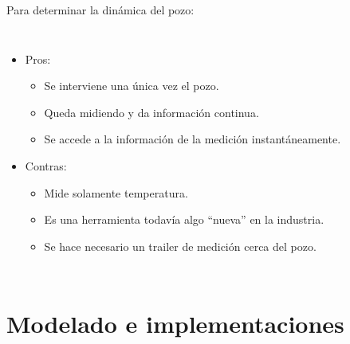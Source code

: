 \documentclass[presentation]{beamer}
\begin{document}
\begin{frame}{Para determinar la dinámica del pozo:}
\begin{columns}
		\begin{itemize}
			\item Pros:
			\begin{itemize}
				\item Se interviene una única vez el pozo.
				\item Queda midiendo y da información continua.
				\item Se accede a la información de la medición instantáneamente.
			\end{itemize}
			\item Contras:
			\begin{itemize}
				\item Mide solamente temperatura. 
				\item Es una herramienta todavía algo ``nueva'' en la industria.
				\item Se hace necesario un trailer de medición cerca del pozo.
			\end{itemize}
			
		\end{itemize}
	\end{columns}
\end{frame}



\section{Modelado e implementaciones}
\end{document}
